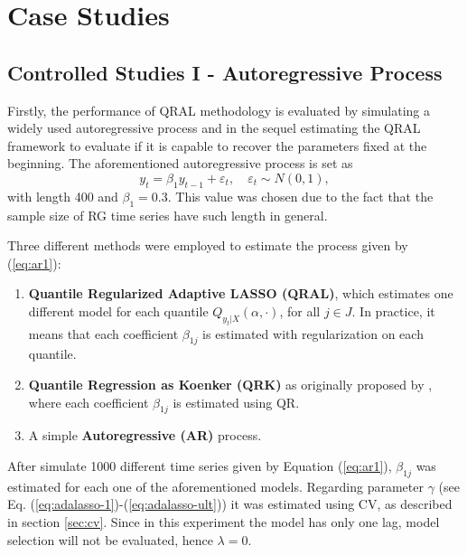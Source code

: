 \chapter{Case Studies}


\section{Controlled Studies I - Autoregressive Process} \label{sec:ar-study}


Firstly, the performance of QRAL methodology is evaluated by simulating a widely used autoregressive process and in the sequel estimating the QRAL framework to evaluate if it is capable to recover the parameters fixed at the beginning. 
The aforementioned autoregressive process is set as
\begin{equation}
y_t = \beta_1 y_{t-1} + \varepsilon_t, \quad \varepsilon_t \sim N(0, 1), \label{eq:ar1}
\end{equation}
with length 400 and $\beta_1 = 0.3$. This value was chosen due to the fact that the sample size of RG time series have such length in general.

Three different methods were employed to estimate the process given by (\ref{eq:ar1}):
\begin{enumerate}
\item \textbf{Quantile Regularized Adaptive LASSO (QRAL)}, which estimates one different model for each quantile $Q_{y_t|X}(\alpha,\cdot)$, for all ${j \in J}$. In practice, it means that each coefficient $\beta_{1j}$ is estimated with regularization on each quantile. %
\item \textbf{Quantile Regression as Koenker (QRK)} as originally proposed by \cite{koenker1978regression}, where each coefficient $\beta_{1j}$ is estimated using QR. 
\item A simple \textbf{Autoregressive (AR)} process.%


\end{enumerate}

After simulate 1000 different time series given by Equation (\ref{eq:ar1}), $\beta_{1j}$ was estimated for each one of the aforementioned models. Regarding parameter $\gamma$ (see Eq. (\ref{eq:adalasso-1})-(\ref{eq:adalasso-ult})) it was estimated using CV, as described in section \ref{sec:cv}. Since in this experiment the model has only one lag, model selection will not be evaluated, hence $\lambda=0$.

